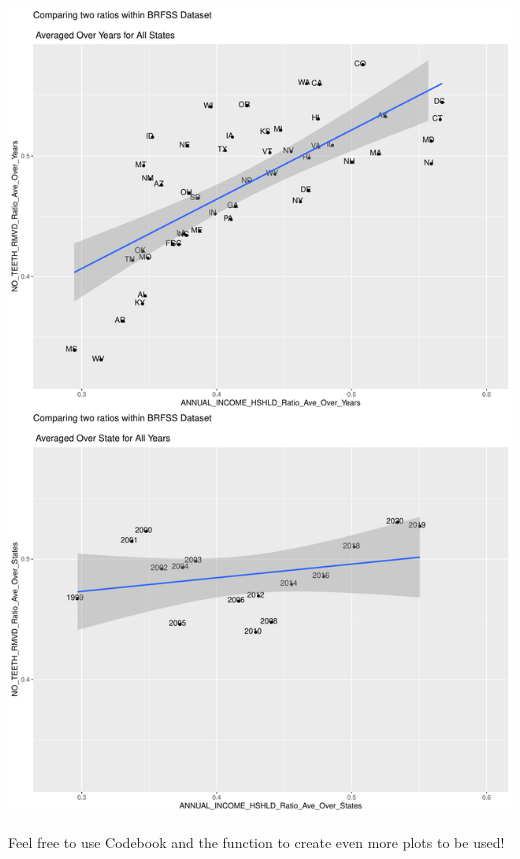 \documentclass[
]{article}
\begin{document}
\includegraphics{BRFSS_Graphic_Reproduction_files/figure-latex/unnamed-chunk-11-1.pdf}

Feel free to use Codebook and the function to create even more plots to
be used!
\end{document}
